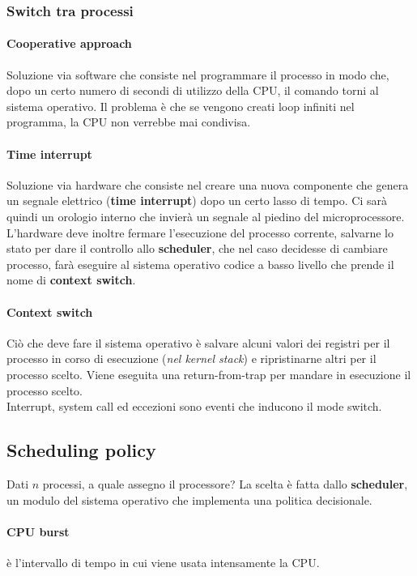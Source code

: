 \documentclass[12pt, twoside, letterpaper]{article}
\begin{document}
			\subsubsection{Switch tra processi}
				
				\paragraph{Cooperative approach} Soluzione via software che consiste nel programmare il processo in modo che, dopo un certo numero di secondi di utilizzo della CPU, il comando torni al sistema operativo. Il problema è che se vengono creati loop infiniti nel programma, la CPU non verrebbe mai condivisa.
				
				\paragraph{Time interrupt} Soluzione via hardware che consiste nel creare una nuova componente che genera un segnale elettrico (\textbf{time interrupt}) dopo un certo lasso di tempo. Ci sarà quindi un orologio interno che invierà un segnale al piedino del microprocessore. L'hardware deve inoltre fermare l'esecuzione del processo corrente, salvarne lo stato per dare il controllo allo \textbf{scheduler}, che nel caso decidesse di cambiare processo, farà eseguire al sistema operativo codice a basso livello che prende il nome di \textbf{context switch}. 
				
				\paragraph{Context switch} Ciò che deve fare il sistema operativo è salvare alcuni valori dei registri per il processo in corso di esecuzione (\textit{nel kernel stack}) e ripristinarne altri per il processo scelto. Viene eseguita una return-from-trap per mandare in esecuzione il processo scelto.\\
				Interrupt, system call ed eccezioni sono eventi che inducono il mode switch. 

		\subsection{Scheduling policy}
			Dati $n$ processi, a quale assegno il processore?
			La scelta è fatta dallo \textbf{scheduler}, un modulo del sistema operativo che implementa una politica decisionale.
			\paragraph{CPU burst} è l'intervallo di tempo in cui viene usata intensamente la CPU. 
\end{document}
